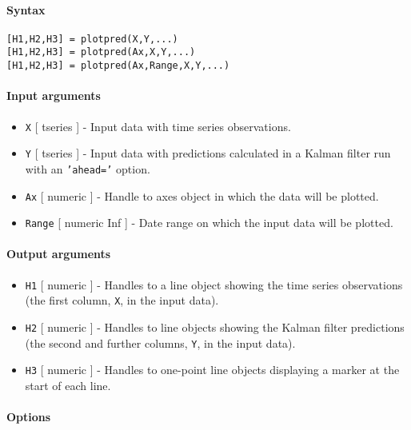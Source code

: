 


	\paragraph{Syntax}

\begin{verbatim}
[H1,H2,H3] = plotpred(X,Y,...)
[H1,H2,H3] = plotpred(Ax,X,Y,...)
[H1,H2,H3] = plotpred(Ax,Range,X,Y,...)
\end{verbatim}

\paragraph{Input arguments}

\begin{itemize}
\item
  \texttt{X} {[} tseries {]} - Input data with time series observations.
\item
  \texttt{Y} {[} tseries {]} - Input data with predictions calculated in
  a Kalman filter run with an \texttt{'ahead='} option.
\item
  \texttt{Ax} {[} numeric {]} - Handle to axes object in which the data
  will be plotted.
\item
  \texttt{Range} {[} numeric \textbar{} Inf {]} - Date range on which
  the input data will be plotted.
\end{itemize}

\paragraph{Output arguments}

\begin{itemize}
\item
  \texttt{H1} {[} numeric {]} - Handles to a line object showing the
  time series observations (the first column, \texttt{X}, in the input
  data).
\item
  \texttt{H2} {[} numeric {]} - Handles to line objects showing the
  Kalman filter predictions (the second and further columns, \texttt{Y},
  in the input data).
\item
  \texttt{H3} {[} numeric {]} - Handles to one-point line objects
  displaying a marker at the start of each line.
\end{itemize}

\paragraph{Options}

